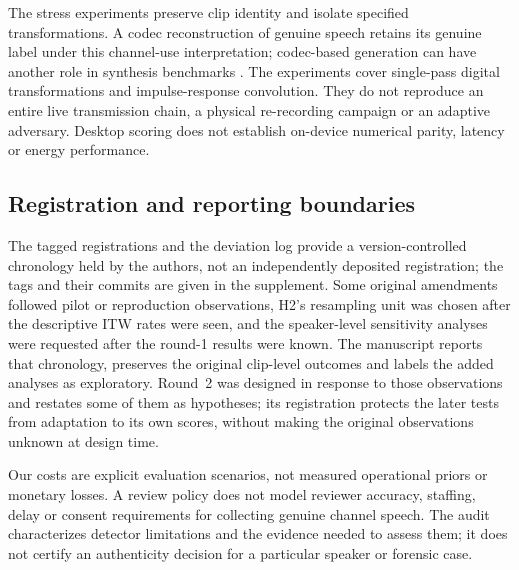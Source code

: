 The stress experiments preserve clip identity and isolate specified transformations. A codec reconstruction of
genuine speech retains its genuine label under this channel-use interpretation; codec-based generation can have
another role in synthesis benchmarks \citep{wu24_codecfake,wang25_asvspoof5_db,xiao26_resynth}. The experiments cover
single-pass digital transformations and impulse-response convolution. They do not reproduce an entire live
transmission chain, a physical re-recording campaign or an adaptive adversary. Desktop scoring does not establish
on-device numerical parity, latency or energy performance.

\subsection{Registration and reporting boundaries}
The tagged registrations and the deviation log provide a version-controlled chronology held by the authors, not an
independently deposited registration; the tags and their commits are given in the supplement. Some original amendments
followed pilot or reproduction observations, H2's resampling unit was chosen after the descriptive ITW rates were seen,
and the speaker-level sensitivity analyses were requested after the round-1 results were known. The manuscript reports
that chronology, preserves the original clip-level outcomes and labels the added analyses as exploratory. Round~2 was
designed in response to those observations and restates some of them as hypotheses; its registration protects the later
tests from adaptation to its own scores, without making the original observations unknown at design time.

Our costs are explicit evaluation scenarios, not measured operational priors or monetary losses. A review policy
does not model reviewer accuracy, staffing, delay or consent requirements for collecting genuine channel speech.
The audit characterizes detector limitations and the evidence needed to assess them; it does not certify an
authenticity decision for a particular speaker or forensic case.
